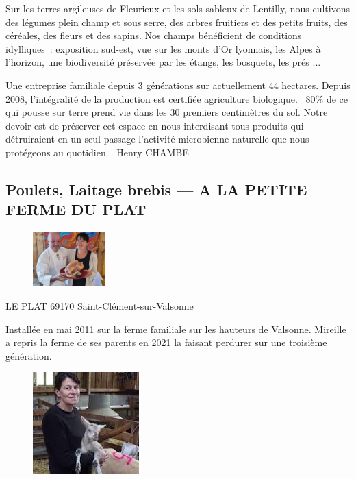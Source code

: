 \documentclass[8pt,a4paper,french]{article}
\makeatletter
\newcommand{\authoredby}[1]{\addtocontents{toc}{\protect\@nameuse{authoredby#1}}}%
\makeatother
\begin{document}
\noindent Sur les terres argileuses de Fleurieux et les sols sableux
de Lentilly, nous cultivons des légumes plein champ et sous serre, des
arbres fruitiers et des petits fruits, des céréales, des fleurs et des
sapins. Nos champs bénéficient de conditions idylliques\ : exposition
sud-est, vue sur les monts d'Or lyonnais, les Alpes à l'horizon, une
biodiversité préservée par les étangs, les bosquets, les prés ...\newline

\noindent Une entreprise familiale depuis 3 générations sur
actuellement 44 hectares. Depuis 2008, l'intégralité de la production
est certifiée agriculture biologique. \guillemotleft\ 80\% de ce qui
pousse sur terre prend vie dans les 30 premiers centimètres du
sol. Notre devoir est de préserver cet espace en nous interdisant tous
produits qui détruiraient en un seul passage l'activité microbienne
naturelle que nous protégeons au quotidien. \guillemotright\ Henry
CHAMBE

\newpage

\authoredby{B}
\subsection{Poulets, Laitage brebis --- A LA PETITE FERME DU PLAT}\label{subsec:poulets}

\begin{figure}
\includegraphics[width=0.25\textwidth]{GRILLET1.jpg}
\end{figure}

\newline
LE PLAT 69170 Saint-Clément-sur-Valsonne\newline

\noindent Installée en mai 2011 sur la ferme familiale sur les
hauteurs de Valsonne. Mireille a repris la ferme de ses parents en
2021 la faisant perdurer sur une troisième génération.\newline

\vspace{3em}

\begin{figure}
\includegraphics[height=0.2\textwidth]{GRILLET2.jpg}
\end{figure}
\end{document}
